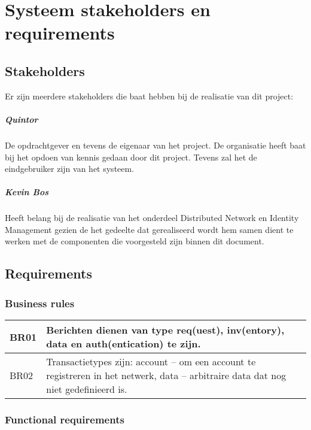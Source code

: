 \chapter{Systeem stakeholders en requirements}

\section{Stakeholders}

Er zijn meerdere stakeholders die baat hebben bij de realisatie van dit project:

\paragraph{Quintor} De opdrachtgever en tevens de eigenaar van het project. De organisatie heeft baat bij het opdoen van kennis gedaan door dit project. Tevens zal het de eindgebruiker zijn van het systeem.

\paragraph{Kevin Bos} Heeft belang bij de realisatie van het onderdeel Distributed Network en Identity Management gezien de het gedeelte dat gerealiseerd wordt hem samen dient te werken met de componenten die voorgesteld zijn binnen dit document.

\section{Requirements}

\subsection{Business rules}
\begin{tabular}{|p{1.1cm}|p{11cm}|}
  \hline
  BR01 & Berichten dienen van type req(uest), inv(entory), data en auth(entication) te zijn. \\
  \hline
  BR02 & Transactietypes zijn: account -- om een account te registreren in het netwerk, data -- arbitraire data dat nog niet gedefinieerd is. \\
  \hline
\end{tabular}

\newpage
\subsection{Functional requirements}


